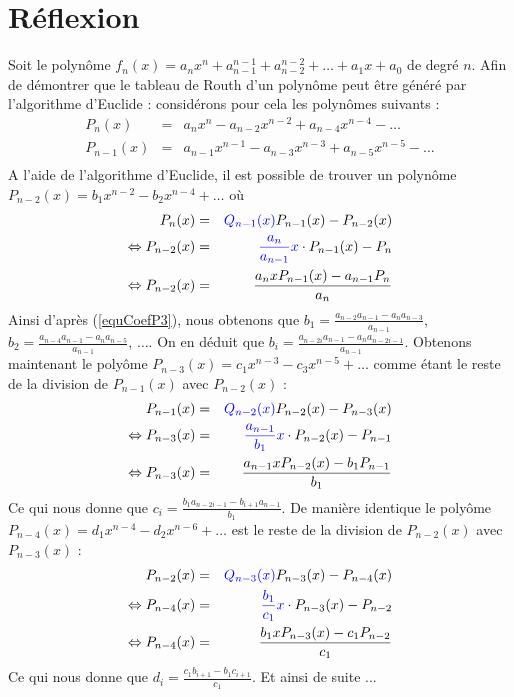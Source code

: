 \documentclass[11pt]{article}
\begin{document}
\section*{Réflexion}
Soit le polynôme $f_n(x) = a_n x^{n} + a_{n-1}^{n-1} + a_{n-2}^{n-2}+\dots + a_1x+a_0$ de degré $n$. Afin de démontrer que le tableau de Routh d'un polynôme
peut être généré par l'algorithme d'Euclide : considérons pour cela les polynômes suivants :
\begin{eqnarray}
  P_n(x)&=& a_nx^n-a_{n-2}x^{n-2}+a_{n-4}x^{n-4}-\dots\\
  P_{n-1}(x)&=& a_{n-1}x^{n-1}-a_{n-3}x^{n-3}+a_{n-5}x^{n-5}-\dots\\
\end{eqnarray}
A l'aide de l'algorithme d'Euclide, il est possible de trouver un polynôme $P_{n-2} (x) = b_{1}x^{n-2}-b_{2}x^{n-4}+\dots$ où
\begin{eqnarray}
  P_n (x)   &=& \color{blue}{Q_{n-1}(x)} \color{black}P_{n-1}(x)-P_{n-2}(x) \nonumber\\
  \Leftrightarrow P_{n-2}(x) &=& \color{blue}\frac{a_n}{a_{n-1}}x\color{black} \cdot P_{n-1}(x) - P_{n} \nonumber\\
  \Leftrightarrow P_{n-2}(x) &=& \frac{a_n x P_{n-1}(x) - a_{n-1}P_n}{a_n} \label{equCoefP3}
\end{eqnarray}
Ainsi d'après (\ref{equCoefP3}), nous obtenons que $b_1 = \frac{a_{n-2}a_{n-1}-a_n a_{n-3}}{a_{n-1}}$,
$b_2 = \frac{a_{n-4}a_{n-1}-a_n a_{n-5}}{a_{n-1}}$, $\dots$. On en déduit que $b_i = \frac{a_{n-2i}a_{n-1}-a_n a_{n-2i-1}}{a_{n-1}}$.
Obtenons maintenant le polyôme $P_{n-3}(x) = c_1x^{n-3}-c_3x^{n-5}+\dots$ comme étant le reste de la division de $P_{n-1}(x)$ avec $P_{n-2}(x)$ :
\begin{eqnarray}
  P_{n-1} (x)   &=& \color{blue}{Q_{n-2}(x)} \color{black}P_{n-2}(x)-P_{n-3}(x) \nonumber\\
  \Leftrightarrow P_{n-3}(x) &=& \color{blue}\frac{a_{n-1}}{b_1}x\color{black} \cdot P_{n-2}(x) - P_{n-1} \nonumber\\
  \Leftrightarrow P_{n-3}(x) &=& \frac{a_{n-1} x P_{n-2}(x) - b_1P_{n-1}}{b_1}
\end{eqnarray}
Ce qui nous donne que $c_i = \frac{b_1a_{n-2i-1}-b_{i+1}a_{n-1}}{b_1}$.
De manière identique le polyôme $P_{n-4}(x) = d_1x^{n-4}-d_2x^{n-6}+\dots$ est le reste de la division de $P_{n-2}(x)$ avec $P_{n-3}(x)$ :
\begin{eqnarray}
  P_{n-2} (x)   &=& \color{blue}{Q_{n-3}(x)} \color{black}P_{n-3}(x)-P_{n-4}(x) \nonumber\\
  \Leftrightarrow P_{n-4}(x) &=& \color{blue}\frac{b_1}{c_1}x\color{black} \cdot P_{n-3}(x) - P_{n-2} \nonumber\\
  \Leftrightarrow P_{n-4}(x) &=& \frac{b_1 x P_{n-3}(x) - c_1P_{n-2}}{c_1}
\end{eqnarray}
Ce qui nous donne que $d_i = \frac{c_1b_{i+1}-b_1c_{i+1}}{c_1}$. Et ainsi de suite ...\\
\end{document}
